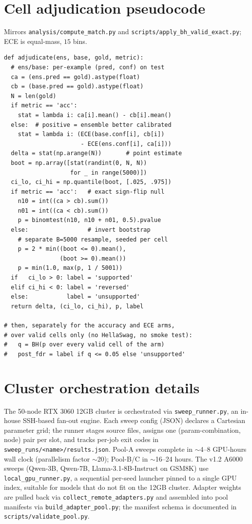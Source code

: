 \documentclass[11pt]{article}
\begin{document}
\section{Cell adjudication pseudocode}\label{app:pseudocode}
Mirrors \texttt{analysis/\allowbreak compute\_\allowbreak match.\allowbreak py} and \texttt{scripts/\allowbreak apply\_\allowbreak bh\_\allowbreak valid\_\allowbreak exact.\allowbreak py}; ECE is equal-mass, $15$ bins.
{\scriptsize\begin{verbatim}
def adjudicate(ens, base, gold, metric):
  # ens/base: per-example (pred, conf) on test
  ca = (ens.pred == gold).astype(float)
  cb = (base.pred == gold).astype(float)
  N = len(gold)
  if metric == 'acc':
    stat = lambda i: ca[i].mean() - cb[i].mean()
  else:  # positive = ensemble better calibrated
    stat = lambda i: (ECE(base.conf[i], cb[i])
                      - ECE(ens.conf[i], ca[i]))
  delta = stat(np.arange(N))       # point estimate
  boot = np.array([stat(randint(0, N, N))
                   for _ in range(5000)])
  ci_lo, ci_hi = np.quantile(boot, [.025, .975])
  if metric == 'acc':   # exact sign-flip null
    n10 = int((ca > cb).sum())
    n01 = int((ca < cb).sum())
    p = binomtest(n10, n10 + n01, 0.5).pvalue
  else:                 # invert bootstrap
    # separate B=5000 resample, seeded per cell
    p = 2 * min((boot <= 0).mean(),
                (boot >= 0).mean())
    p = min(1.0, max(p, 1 / 5001))
  if   ci_lo > 0: label = 'supported'
  elif ci_hi < 0: label = 'reversed'
  else:           label = 'unsupported'
  return delta, (ci_lo, ci_hi), p, label

# then, separately for the accuracy and ECE arms,
# over valid cells only (no HellaSwag, no smoke test):
#   q = BH(p over every valid cell of the arm)
#   post_fdr = label if q <= 0.05 else 'unsupported'
\end{verbatim}}

\section{Cluster orchestration details}\label{app:cluster}
The 50-node RTX 3060 12GB cluster is orchestrated via \texttt{sweep\_runner.py}, an in-house SSH-based fan-out engine. Each sweep config (JSON) declares a Cartesian parameter grid; the runner stages source files, assigns one (param-combination, node) pair per slot, and tracks per-job exit codes in \texttt{sweep\_\allowbreak runs/\allowbreak <name>/\allowbreak results.\allowbreak json}. Pool-A sweeps complete in $\sim$4--8 GPU-hours wall clock (parallelism factor $\sim$20); Pool-B/C in $\sim$16--24 hours. The v1.2 A6000 sweeps (Qwen-3B, Qwen-7B, Llama-3.1-8B-Instruct on GSM8K) use \texttt{local\_\allowbreak gpu\_\allowbreak runner.\allowbreak py}, a sequential per-seed launcher pinned to a single GPU index, suitable for models that do not fit on the 12GB cluster. Adapter weights are pulled back via \texttt{collect\_\allowbreak remote\_\allowbreak adapters.\allowbreak py} and assembled into pool manifests via \texttt{build\_\allowbreak adapter\_\allowbreak pool.\allowbreak py}; the manifest schema is documented in \texttt{scripts/\allowbreak validate\_\allowbreak pool.\allowbreak py}.
\end{document}
